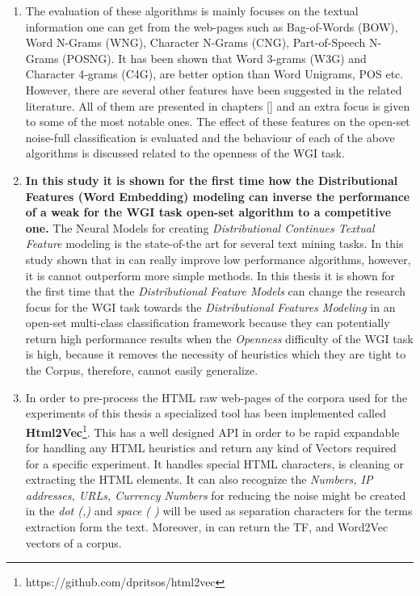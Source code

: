 \begin{enumerate}
\item The evaluation of these algorithms is mainly focuses on the textual information one can get from the web-pages such as Bag-of-Words (BOW), Word N-Grams (WNG), Character N-Grams (CNG), Part-of-Speech N-Grams (POSNG). It has been shown that Word 3-grams (W3G) and Character 4-grams (C4G), are better option than Word Unigrams, POS etc. However, there are several other features have been suggested in the related literature. All of them are presented in chapters \ref{} and an extra focus is given to some of the most notable ones. The effect of these features on the open-set noise-full classification is evaluated and the behaviour of each of the above algorithms is discussed related to the openness of the WGI task.
\item \textbf{In this study it is shown for the first time how the Distributional Features (Word Embedding) modeling can inverse the performance of a weak for the WGI task open-set algorithm to a competitive one.} The Neural Models for creating \textit{Distributional Continues Textual Feature} modeling is the state-of-the art for several text mining tasks. In this study shown that in can really improve low performance algorithms, however, it is cannot outperform more simple methods. In this thesis it is shown for the first time that the \textit{Distributional Feature Models} can change the research focus for the WGI task towards the \textit{Distributional Features Modeling} in an open-set multi-class classification framework because they can potentially return high performance results when the \textit{Openness} difficulty of the WGI task is high, because it removes the necessity of heuristics which they are tight to the Corpus, therefore, cannot easily generalize.
\item In order to pre-process the HTML raw web-pages of the corpora used for the experiments of this thesis a specialized tool has been implemented called \textbf{Html2Vec}\footnote{https://github.com/dpritsos/html2vec}. This has a well designed API in order to be rapid expandable for handling any HTML heuristics and return any kind of Vectors required for a specific experiment. It handles special HTML characters, is cleaning or extracting the HTML elements. It can also recognize the \textit{Numbers, IP addresses, URLs, Currency Numbers} for reducing the noise might be created in the \textit{dot (,)} and \textit{space ( )} will be used as separation characters for the terms extraction form the text. Moreover, in can return the TF, and Word2Vec vectors of a corpus.
\end{enumerate}



